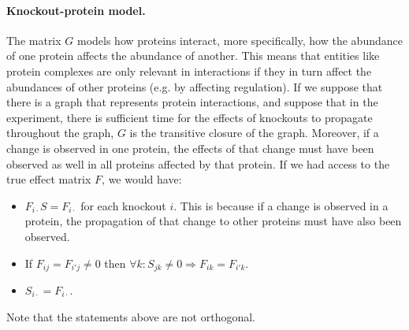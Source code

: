 \documentclass{article}
\begin{document}
\paragraph{Knockout-protein model.}
The matrix $G$ models how proteins interact, more specifically, how the abundance of one protein affects the abundance of another.
This means that entities like protein complexes are only relevant in interactions if they in turn affect the abundances of other proteins (e.g. by affecting regulation).
If we suppose that there is a graph that represents protein interactions, and suppose that in the experiment, there is sufficient time for the effects of knockouts to propagate throughout the graph, $G$ is the transitive closure of the graph.
Moreover, if a change is observed in one protein, the effects of that change must have been observed as well in all proteins affected by that protein.
If we had access to the true effect matrix $F$, we would have:
\begin{itemize}
 \item $F_{i \cdot} S = F_{i \cdot}$ for each knockout $i$. This is because if a change is observed in a protein, the propagation of that change to other proteins must have also been observed.
 \item If $F_{i j} = F_{i' j} \neq 0$ then $\forall k : S_{j k} \neq 0 \Rightarrow F_{i k} = F_{i' k}$.
 \item $S_{i \cdot} = F_{i \cdot}$.
\end{itemize}
Note that the statements above are not orthogonal.
\end{document}
